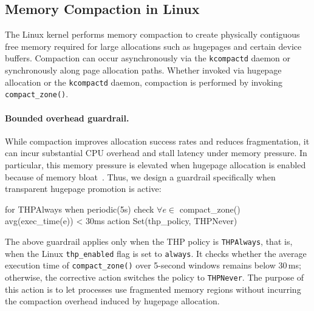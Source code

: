 \subsection{Memory Compaction in Linux}
\label{subsec:compaction-case-study}

The Linux kernel performs memory compaction to create physically contiguous free memory required for large allocations such as hugepages and certain device buffers.
Compaction can occur asynchronously via the {\tt kcompactd} daemon or synchronously along page allocation paths.
Whether invoked via hugepage allocation or the {\tt kcompactd} daemon, compaction is performed by invoking {\tt compact_zone()}.

\paragraph{Bounded overhead guardrail.}
While compaction improves allocation success rates and reduces fragmentation, it can incur substantial CPU overhead and stall latency under memory pressure. 
In particular, this memory pressure is elevated when hugepage allocation is enabled because of memory bloat~\cite{cbmm-atc22,ingens-osdi16}. 
Thus, we design a guardrail specifically when transparent hugepage promotion is active:
\begin{dslbox}[title={Listing~\theguardcount: Bounded overhead of memory compaction}, glabel=lst:compaction]
for THPAlways
when periodic(5s)
check $\forall e \in$ compact_zone() avg(exec_time(e)) < 30ms
action Set(thp_policy, THPNever)
\end{dslbox}


The above guardrail applies only when the THP policy is {\tt THPAlways}, that is, when the Linux {\tt thp\_enabled} flag is set to {\tt always}. It checks whether the average execution time of {\tt compact\_zone()} over 5-second windows remains below 30\,ms; otherwise, the corrective action switches the policy to {\tt THPNever}. The purpose of this action is to let processes use fragmented memory regions without incurring the compaction overhead induced by hugepage allocation.

